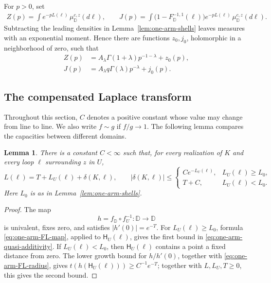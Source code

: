 \documentclass[11pt]{article}
\numberwithin{equation}{section}
\newcommand{\D}{\mathbb{D}}
\newcommand{\1}{\mathbf{1}}
\newtheorem{lemma}[theorem]{Lemma}
\begin{document}
For \(p>0\), set
\begin{align*}
 Z(p)=\int e^{-pL(\ell)}\,\mu_\D^{c,z}(d\ell),\qquad
 J(p)=\int \bigl(1-F_\D^{-1,1}(\ell)\bigr)e^{-pL(\ell)}
                 \,\mu_\D^{c,z}(d\ell).
\end{align*}
Subtracting the leading densities in
Lemma~\ref{lem:one-arm-shells} leaves measures with an exponential moment.
Hence there are functions \(z_0,j_0\), holomorphic in a neighborhood of
zero, such that
\begin{align}
 Z(p)&=A_\lambda\Gamma(1+\lambda)p^{-1-\lambda}+z_0(p),
 \label{eq:one-arm-Z-expansion}\\
 J(p)&=A_\lambda q\Gamma(\lambda)p^{-\lambda}+j_0(p).
 \label{eq:one-arm-J-expansion}
\end{align}

\subsection{The compensated Laplace transform}

Throughout this section, \(C\) denotes a positive constant whose value may
change from line to line. We also write \(f\sim g\) if \(f/g\to1\). The following lemma compares the capacities between different domains.
\begin{lemma}\label{lem:one-arm-quasi-additivity}
There is a constant \(C<\infty\) such that, for every realization of
\(K\) and every loop \(\ell\) surrounding \(z\) in \(U\),
\begin{equation}\label{eq:one-arm-quasi-additivity}
 L(\ell)=T+L_U(\ell)+\delta(K,\ell),\qquad
 |\delta(K,\ell)|\le
 \begin{cases}
  Ce^{-L_U(\ell)},&L_U(\ell)\ge L_0,\\
  T+C,&L_U(\ell)<L_0.
 \end{cases}
\end{equation}
Here $L_0$ is as in Lemma~\ref{lem:one-arm-shells}.
\end{lemma}

\begin{proof}
The map
\[
 h=f_\D\circ f_U^{-1}:\D\longrightarrow\D
\]
is univalent, fixes zero, and satisfies \(|h'(0)|=e^{-T}\).  For
\(L_U(\ell)\ge L_0\), formula \eqref{eq:one-arm-FL-map}, applied to
\(\mathsf H_U(\ell)\), gives the first bound in
\eqref{eq:one-arm-quasi-additivity}.  If \(L_U(\ell)<L_0\), then
\(\mathsf H_U(\ell)\) contains a point a fixed distance from zero.  The
lower growth bound for \(h/h'(0)\), together with
\eqref{eq:one-arm-FL-radius}, gives
\(t(h(\mathsf H_U(\ell)))\ge C^{-1}e^{-T}\); together with
\(L,L_U,T\ge0\), this gives the second bound.
\end{proof}
\end{document}
